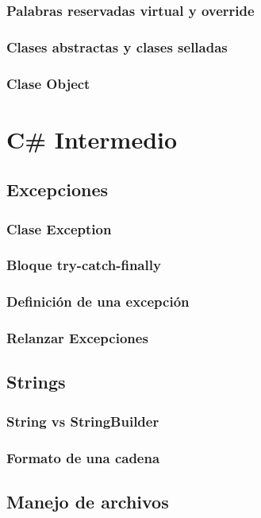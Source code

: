 \documentclass[12pt,a4paper]{report}
\begin{document}
\section{Palabras reservadas virtual y override}
\section{Clases abstractas y clases selladas}
\section{Clase Object}

\part{C\# Intermedio}

\chapter{Excepciones}
\section{Clase Exception}
\section{Bloque try-catch-finally}
\section{Definición de una excepción}
\section{Relanzar Excepciones}

\chapter{Strings}
\section{String vs StringBuilder}
\section{Formato de una cadena}
	
\chapter{Manejo de archivos}
\end{document}
